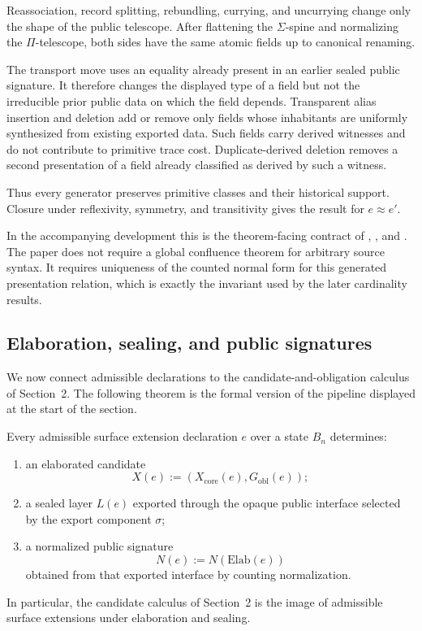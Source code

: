 \documentclass{lmcs}
\begin{document}
Reassociation, record splitting, rebundling, currying, and uncurrying change only the shape of
the public telescope.  After flattening the \(\Sigma\)-spine and normalizing the
\(\Pi\)-telescope, both sides have the same atomic fields up to canonical renaming.

The transport move uses an equality already present in an earlier sealed public signature.
It therefore changes the displayed type of a field but not the irreducible prior public data
on which the field depends.  Transparent alias insertion and deletion add or remove only
fields whose inhabitants are uniformly synthesized from existing exported data.  Such fields
carry derived witnesses and do not contribute to primitive trace cost.  Duplicate-derived
deletion removes a second presentation of a field already classified as derived by such a
witness.

Thus every generator preserves primitive classes and their historical support.  Closure under
reflexivity, symmetry, and transitivity gives the result for \(e\approx e'\).

In the accompanying development this is the theorem-facing contract of
,
, and
.  The paper does not require a global confluence
theorem for arbitrary source syntax.  It requires uniqueness of the counted normal form for
this generated presentation relation, which is exactly the invariant used by the later
cardinality results.

\subsection{Elaboration, sealing, and public signatures}

We now connect admissible declarations to the candidate-and-obligation calculus of
Section~2.  The following theorem is the formal version of the pipeline displayed at the
start of the section.

\begin{thm}
Every admissible surface extension declaration \(e\) over a state \(B_n\) determines:
\begin{enumerate}
\item an elaborated candidate
\[
  X(e) := (X_{\mathrm{core}}(e),G_{\mathrm{obl}}(e));
\]
\item a sealed layer \(L(e)\) exported through the opaque public interface selected by the
export component \(\sigma\);
\item a normalized public signature
\[
  N(e) := N(\mathrm{Elab}(e))
\]
obtained from that exported interface by counting normalization.
\end{enumerate}
In particular, the candidate calculus of Section~2 is the image of admissible surface
extensions under elaboration and sealing.
\end{thm}
\end{document}
